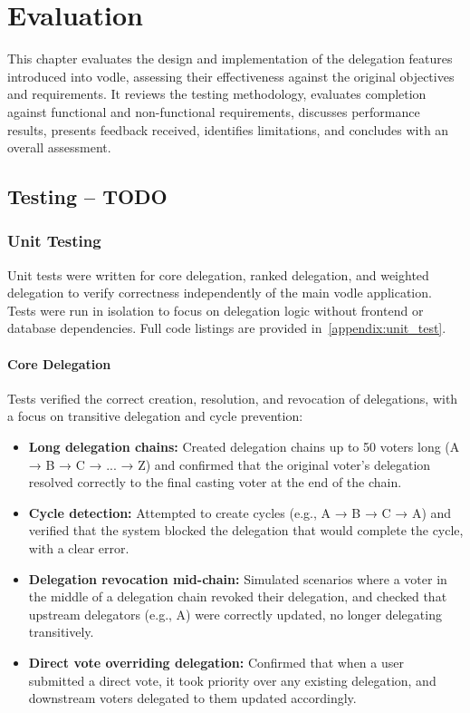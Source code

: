 \chapter{Evaluation}\label{ch:evaluation}

This chapter evaluates the design and implementation of the delegation features introduced into vodle, assessing their effectiveness against the original objectives and requirements. It reviews the testing methodology, evaluates completion against functional and non-functional requirements, discusses performance results, presents feedback received, identifies limitations, and concludes with an overall assessment.

\section{Testing -- TODO}
\subsection{Unit Testing}
Unit tests were written for core delegation, ranked delegation, and weighted delegation to verify correctness independently of the main vodle application. Tests were run in isolation to focus on delegation logic without frontend or database dependencies. Full code listings are provided in~\ref{appendix:unit_test}.
\subsubsection{Core Delegation}
Tests verified the correct creation, resolution, and revocation of delegations, with a focus on transitive delegation and cycle prevention:
\begin{itemize}
    \item\textbf{Long delegation chains:} Created delegation chains up to 50 voters long (A → B → C → ... → Z) and confirmed that the original voter's delegation resolved correctly to the final casting voter at the end of the chain.

    \item\textbf{Cycle detection:} Attempted to create cycles (e.g., A → B → C → A) and verified that the system blocked the delegation that would complete the cycle, with a clear error.

    \item\textbf{Delegation revocation mid-chain:} Simulated scenarios where a voter in the middle of a delegation chain revoked their delegation, and checked that upstream delegators (e.g., A) were correctly updated, no longer delegating transitively.

    \item \textbf{Direct vote overriding delegation:} Confirmed that when a user submitted a direct vote, it took priority over any existing delegation, and downstream voters delegated to them updated accordingly.
\end{itemize}

